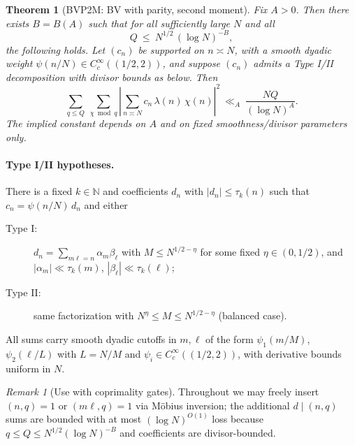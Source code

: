 \documentclass[11pt]{article}
\newtheorem{theorem}[lemma]{Theorem}
\theoremstyle{definition}
\theoremstyle{remark}
\newtheorem{remark}[lemma]{Remark}
\numberwithin{equation}{part}
\begin{document}
\begin{theorem}[BVP2M: BV with parity, second moment]\label{thm:BVP2M}
	Fix $A>0$. Then there exists $B=B(A)$ such that for all sufficiently large $N$ and all
	\[
		Q \ \le\ N^{1/2}\,(\log N)^{-B},
	\]
	the following holds. Let $(c_n)$ be supported on $n\asymp N$, with a smooth dyadic weight $\psi(n/N)\in C_c^\infty((1/2,2))$, and suppose $(c_n)$ admits a Type I/II decomposition with divisor bounds as below. Then
	\begin{equation}\label{eq:BVP2M-goal}
		\sum_{q\le Q}\ \sum_{\chi\bmod q}
		\left|\sum_{n\asymp N} c_n\,\lambda(n)\,\chi(n)\right|^2
		\ \ll_{A}\ \frac{NQ}{(\log N)^A}.
	\end{equation}
	The implied constant depends on $A$ and on fixed smoothness/divisor parameters only.
\end{theorem}

\paragraph{Type I/II hypotheses.}
There is a fixed $k\in\mathbb N$ and coefficients $d_n$ with $|d_n|\le \tau_k(n)$ such that
$c_n=\psi(n/N)\,d_n$ and either
\begin{description}
	\item[Type I:] $d_n=\displaystyle\sum_{m\ell=n}\alpha_m\beta_\ell$ with $M\le N^{1/2-\eta}$ for some fixed $\eta\in(0,1/2)$, and
	      $|\alpha_m|\ll \tau_k(m)$, $|\beta_\ell|\ll \tau_k(\ell)$;
	\item[Type II:] same factorization with $N^{\eta}\le M\le N^{1/2-\eta}$ (balanced case).
\end{description}
All sums carry smooth dyadic cutoffs in $m,\ell$ of the form $\psi_1(m/M)$, $\psi_2(\ell/L)$ with $L=N/M$ and $\psi_i\in C_c^\infty((1/2,2))$,
with derivative bounds uniform in $N$.

\begin{remark}[Use with coprimality gates]
	Throughout we may freely insert $(n,q)=1$ or $(m\ell,q)=1$ via Möbius inversion; the additional $d\mid (n,q)$ sums are bounded with at most $(\log N)^{O(1)}$ loss because $q\le Q\le N^{1/2}(\log N)^{-B}$ and coefficients are divisor-bounded.
\end{remark}
\end{document}
